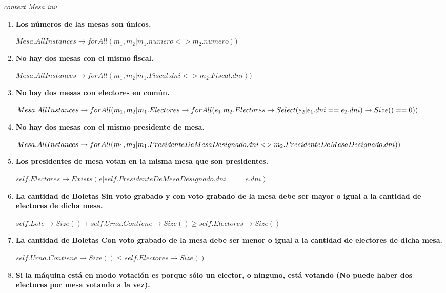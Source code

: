 \textit{context Mesa
inv}
\begin{enumerate}

\item \textbf{Los n\'umeros de las mesas son únicos.}

$Mesa.AllInstances \rightarrow forAll(m_1, m_2 | m_1.numero <> m_2.numero))$

\item  \textbf{No hay dos mesas con el mismo fiscal.}

$Mesa.AllInstances \rightarrow forAll(m_1, m_2 | m_1.Fiscal.dni <> m_2.Fiscal.dni))$

\item \textbf{No hay dos mesas con electores en común.}

$Mesa.AllInstances \rightarrow \\
 forAll(m_1, m_2 | m_1.Electores \rightarrow \\
 forAll(e_1 | m_2.Electores \rightarrow Select(e_2 | e_1.dni==e_2.dni) \rightarrow Size() == 0))$

\item \textbf{No hay dos mesas con el mismo presidente de mesa.}

$Mesa.AllInstances \rightarrow \\
forAll(m_1, m_2 | m_1.PresidenteDeMesaDesignado.dni <> m_2.PresidenteDeMesaDesignado.dni))$

\item \textbf{Los presidentes de mesa votan en la misma mesa que son presidentes.}

$self.Electores \rightarrow Exists(e | self.PresidenteDeMesaDesignado.dni == e.dni)$

\item \textbf{La cantidad de Boletas Sin voto grabado y con voto grabado de la mesa debe ser mayor o igual a la cantidad de electores de dicha mesa.}

$self.Lote \rightarrow Size() + self.Urna.Contiene \rightarrow Size () \geq self.Electores \rightarrow Size()$

\item \textbf{La cantidad de Boletas Con voto grabado de la mesa debe ser menor o igual a la cantidad de electores de dicha mesa.}

$self.Urna.Contiene  \rightarrow  Size() \leq self.Electores \rightarrow Size()$

\item \textbf{Si la máquina está en modo votación es porque s\'olo un elector, o ninguno, está votando (No puede haber dos electores por mesa votando a la vez).}


\end{enumerate}
